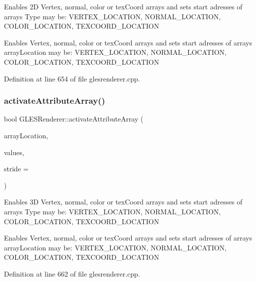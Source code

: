 Enables 2D Vertex, normal, color or tex\+Coord arrays and sets start adresses of arrays Type may be\+: V\+E\+R\+T\+E\+X\+\_\+\+L\+O\+C\+A\+T\+I\+ON, N\+O\+R\+M\+A\+L\+\_\+\+L\+O\+C\+A\+T\+I\+ON, C\+O\+L\+O\+R\+\_\+\+L\+O\+C\+A\+T\+I\+ON, T\+E\+X\+C\+O\+O\+R\+D\+\_\+\+L\+O\+C\+A\+T\+I\+ON

Enables Vertex, normal, color or tex\+Coord arrays and sets start adresses of arrays array\+Location may be\+: V\+E\+R\+T\+E\+X\+\_\+\+L\+O\+C\+A\+T\+I\+ON, N\+O\+R\+M\+A\+L\+\_\+\+L\+O\+C\+A\+T\+I\+ON, C\+O\+L\+O\+R\+\_\+\+L\+O\+C\+A\+T\+I\+ON, T\+E\+X\+C\+O\+O\+R\+D\+\_\+\+L\+O\+C\+A\+T\+I\+ON 

Definition at line 654 of file glesrenderer.\+cpp.

\mbox{\label{class_g_l_e_s_renderer_a102377bf45b15bb52324214d2e9b6f14}} 
\subsubsection{\texorpdfstring{activateAttributeArray()}{activateAttributeArray()}\hspace{0.1cm}{\footnotesize\ttfamily [2/4]}}
{\footnotesize\ttfamily bool G\+L\+E\+S\+Renderer\+::activate\+Attribute\+Array (\begin{DoxyParamCaption}\item[{Attribute\+Location}]{array\+Location,  }\item[{const Q\+Vector3D $\ast$}]{values,  }\item[{int}]{stride = {} }\end{DoxyParamCaption})}

Enables 3D Vertex, normal, color or tex\+Coord arrays and sets start adresses of arrays Type may be\+: V\+E\+R\+T\+E\+X\+\_\+\+L\+O\+C\+A\+T\+I\+ON, N\+O\+R\+M\+A\+L\+\_\+\+L\+O\+C\+A\+T\+I\+ON, C\+O\+L\+O\+R\+\_\+\+L\+O\+C\+A\+T\+I\+ON, T\+E\+X\+C\+O\+O\+R\+D\+\_\+\+L\+O\+C\+A\+T\+I\+ON

Enables Vertex, normal, color or tex\+Coord arrays and sets start adresses of arrays array\+Location may be\+: V\+E\+R\+T\+E\+X\+\_\+\+L\+O\+C\+A\+T\+I\+ON, N\+O\+R\+M\+A\+L\+\_\+\+L\+O\+C\+A\+T\+I\+ON, C\+O\+L\+O\+R\+\_\+\+L\+O\+C\+A\+T\+I\+ON, T\+E\+X\+C\+O\+O\+R\+D\+\_\+\+L\+O\+C\+A\+T\+I\+ON 

Definition at line 662 of file glesrenderer.\+cpp.

